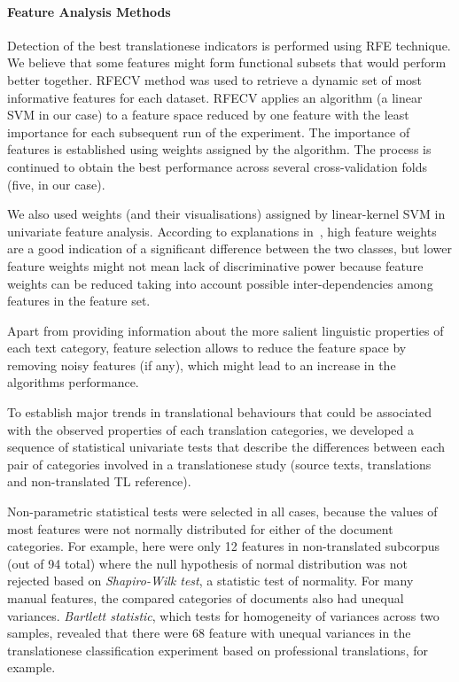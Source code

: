 \paragraph{Feature Analysis Methods}
Detection of the best translationese indicators is performed using \gls{RFE} technique. 
We believe that some features might form functional subsets that would perform better together. \gls{RFECV} method was used to retrieve a dynamic set of most informative features for each dataset. 
\gls{RFECV} applies an algorithm (a linear SVM in our case) to a feature space reduced by one feature with the least importance for each subsequent run of the experiment. The importance of features is established using weights assigned by the algorithm. The process is continued to obtain the best performance across several cross-validation folds (five, in our case). %

We also used weights (and their visualisations) assigned by linear-kernel SVM in univariate feature analysis. According to explanations in~\citet{Volansky2015}, high feature weights are a good indication of a significant difference between the two classes, but lower feature weights might not mean lack of discriminative power because feature weights can be reduced taking into account possible inter-dependencies among features in the feature set.  

Apart from providing information about the more salient linguistic properties of each text category, feature selection allows to reduce the feature space by removing noisy features (if any), which might lead to an increase in the algorithms performance.

To establish major trends in translational behaviours that could be associated with the observed properties of each translation categories, we developed a sequence of statistical univariate tests that describe the  differences between each pair of categories involved in a translationese study (source texts, translations and non-translated TL reference).

Non-parametric statistical tests were selected in all cases, because the values of most features were not normally distributed for either of the document categories. For example, here were only 12 features in non-translated subcorpus (out of 94 total) where the null hypothesis of normal distribution was not rejected based on \textit{Shapiro-Wilk test}, a statistic test of normality.
For many manual features, the compared categories of documents also had unequal variances.   
\textit{Bartlett statistic}, which tests for homogeneity of variances across two samples, revealed that there were 68 feature with unequal variances in the translationese classification experiment based on professional translations, for example. 

